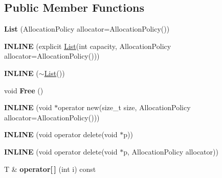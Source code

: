 \subsection*{Public Member Functions}
\begin{DoxyCompactItemize}
\item 
\hypertarget{classv8_1_1internal_1_1_list_ac9af844caa57e127290785bc3d5a1f0b}{}{\bfseries List} (Allocation\+Policy allocator=Allocation\+Policy())\label{classv8_1_1internal_1_1_list_ac9af844caa57e127290785bc3d5a1f0b}

\item 
\hypertarget{classv8_1_1internal_1_1_list_a452ecb4ff1752cef0bba26ed28f1a311}{}{\bfseries I\+N\+L\+I\+N\+E} (explicit \hyperlink{classv8_1_1internal_1_1_list}{List}(int capacity, Allocation\+Policy allocator=Allocation\+Policy()))\label{classv8_1_1internal_1_1_list_a452ecb4ff1752cef0bba26ed28f1a311}

\item 
\hypertarget{classv8_1_1internal_1_1_list_aac7d78f1e7e855f6d4367cc4997c514d}{}{\bfseries I\+N\+L\+I\+N\+E} ($\sim$\hyperlink{classv8_1_1internal_1_1_list}{List}())\label{classv8_1_1internal_1_1_list_aac7d78f1e7e855f6d4367cc4997c514d}

\item 
\hypertarget{classv8_1_1internal_1_1_list_ae04179c064e23cf7737a46bcf4fc7124}{}void {\bfseries Free} ()\label{classv8_1_1internal_1_1_list_ae04179c064e23cf7737a46bcf4fc7124}

\item 
\hypertarget{classv8_1_1internal_1_1_list_ac215eb2a27feffbc790b0061efdae32f}{}{\bfseries I\+N\+L\+I\+N\+E} (void $\ast$operator new(size\+\_\+t size, Allocation\+Policy allocator=Allocation\+Policy()))\label{classv8_1_1internal_1_1_list_ac215eb2a27feffbc790b0061efdae32f}

\item 
\hypertarget{classv8_1_1internal_1_1_list_ae662a2973e9943028685becf85d16b8d}{}{\bfseries I\+N\+L\+I\+N\+E} (void operator delete(void $\ast$p))\label{classv8_1_1internal_1_1_list_ae662a2973e9943028685becf85d16b8d}

\item 
\hypertarget{classv8_1_1internal_1_1_list_a1c3dba6edd57d1b14fc86cd093c369c6}{}{\bfseries I\+N\+L\+I\+N\+E} (void operator delete(void $\ast$p, Allocation\+Policy allocator))\label{classv8_1_1internal_1_1_list_a1c3dba6edd57d1b14fc86cd093c369c6}

\item 
\hypertarget{classv8_1_1internal_1_1_list_a021502e851bbf8d23b5a821e1c2150eb}{}T \& {\bfseries operator\mbox{[}$\,$\mbox{]}} (int i) const \label{classv8_1_1internal_1_1_list_a021502e851bbf8d23b5a821e1c2150eb}


\end{DoxyCompactItemize}

